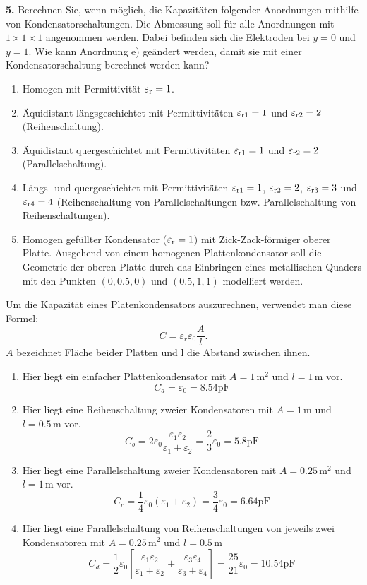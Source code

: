 \documentclass[Protokollheft.tex]{subfiles}
\begin{document}
\begin{framed}
	\noindent \textbf{5.} Berechnen Sie, wenn möglich, die Kapazitäten folgender Anordnungen mithilfe von Kondensatorschaltungen. Die Abmessung soll für alle Anordnungen mit $1\times1\times1$     
angenommen werden. Dabei befinden sich die Elektroden bei $y = 0$ und $y = 1$. Wie kann Anordnung e) geändert werden, damit sie mit einer Kondensatorschaltung berechnet werden kann?
\begin{enumerate}[label=\alph*)]
\item Homogen mit Permittivität $\varepsilon_\text{r}=1$.
\item Äquidistant längsgeschichtet mit Permittivitäten $\varepsilon_{\text{r}1}=1$ und $\varepsilon_{\text{r}2}=2$                    (Reihenschaltung).
\item Äquidistant quergeschichtet mit Permittivitäten $\varepsilon_{\text{r}1}=1$ und $\varepsilon_{\text{r}2}=2$                     (Parallelschaltung).
\item Längs- und quergeschichtet mit Permittivitäten $\varepsilon_{\text{r}1}=1$,                      
$\varepsilon_{\text{r}2}=2$, $\varepsilon_{\text{r}3}=3$ und $\varepsilon_{\text{r}4}=4$ (Reihenschaltung von Parallelschaltungen bzw. Parallelschaltung von Reihenschaltungen).
\item Homogen gefüllter Kondensator ($\varepsilon_\text{r}=1$) mit Zick-Zack-förmiger oberer Platte. Ausgehend von einem homogenen Plattenkondensator soll die Geometrie der oberen Platte durch das Einbringen eines metallischen Quaders mit den Punkten $(0,0.5,0)$ und $(0.5,1,1)$ modelliert werden.
\end{enumerate}
\label{exer:calcCapsAnalytical}
\end{framed}
Um die Kapazität eines Platenkondensators auszurechnen, verwendet man diese Formel:
$$C=\varepsilon_r\varepsilon_0\frac{A}{l}.$$
$A$ bezeichnet Fläche beider Platten und $\text{l}$ die Abstand zwischen ihnen.

\begin{enumerate}[label=(\alph*)]
	\item Hier liegt ein einfacher Plattenkondensator mit  $A=1\,\text{m}^2$ und $l=1\,\text{m}$ vor.\\
	$$C_a=\varepsilon_0=8.54\mathrm{pF}$$
	\item Hier liegt eine Reihenschaltung zweier Kondensatoren mit $A=1\,\text{m}$ und $l=0.5\,\text{m}$ vor. 
	$$C_b=2\varepsilon_0\frac{\varepsilon_1\varepsilon_2}{\varepsilon_1+\varepsilon_2}=\frac{2}{3}\varepsilon_0= 5.8\mathrm{pF}$$
	\item Hier liegt eine Parallelschaltung zweier Kondensatoren mit $A=0.25\,\text{m}^2$ und $l=1\,\text{m}$ vor.
	 $$C_c=\frac{1}{4}\varepsilon_0(\varepsilon_1+\varepsilon_2)=\frac{3}{4}\varepsilon_0=6.64\mathrm{pF}$$
	\item  Hier liegt eine Parallelschaltung von Reihenschaltungen von jeweils zwei Kondensatoren mit $A=0.25\,\text{m}^2$ und $l=0.5\,\text{m}$
	$$C_d=\frac{1}{2}\varepsilon_0\left[\frac{\varepsilon_1\varepsilon_2}{\varepsilon_1+\varepsilon_2}+\frac{\varepsilon_3\varepsilon_4}{\varepsilon_3+\varepsilon_4} \right]=\frac{25}{21}\varepsilon_0=10.54\mathrm{pF}$$
\end{enumerate}
\end{document}
